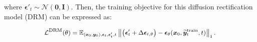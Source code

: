 \noindent
where $\bm\epsilon'_t\sim\mathcal{N}(\bm0, \bm I)$. Then, the training objective for this diffusion rectification model (DRM) can be expressed as:

\vspace{-.25in}
\begin{align}\label{eq:drm-objective}
\small
    {\mathcal{L}}^{\text{DRM}}({\mathbf{\theta}}) = \mathbb{E}_{({\bm{x}}_0,{\bm{y}}_0), \bm{{\mathbf{\epsilon}}}_t,\bm{{\mathbf{\epsilon}}}'_t, t} \left\|\big(\bm{{\mathbf{\epsilon}}}'_t +\Delta\bm{{\mathbf{\epsilon}}}_{t,\theta}\big) -\bm{{\mathbf{\epsilon}}}_{\mathbf{\theta}}({\bm{x}}_0,\widetilde{{\bm{y}}}_t^{\text{train}}, t) \right\|_1.
\end{align}
\vspace{-.2in}





